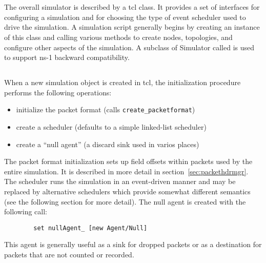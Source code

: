 %
%
\section{}

The overall simulator is described by a  tcl class.
It provides a set of interfaces for configuring a simulation
and for choosing the type of event scheduler used to drive
the simulation.
A simulation script generally begins by creating an instance
of this class and calling various methods to create nodes, topologies,
and configure other aspects of the simulation.
A subclass of Simulator called  is used to support
ns-1 backward compatibility.

\subsection{}

When a new simulation object is created in tcl, the initialization
procedure performs the following operations:
\begin{itemize}
	\item initialize the packet format (calls {\tt create\_packetformat})
	\item create a scheduler (defaults to a simple linked-list scheduler)
	\item create a ``null agent'' (a discard sink used in varios places)
\end{itemize}
The packet format initialization sets up field offsets within packets
used by the entire simulation.  It is described in more detail
in section~\ref{sec:packethdrmgr}.
The scheduler runs the simulation in an event-driven manner and may
be replaced by alternative schedulers which provide somewhat
different semantics (see the following section for more detail).
The null agent is created with the following call:
\begin{small}
\begin{verbatim}
        set nullAgent_ [new Agent/Null]
\end{verbatim}
\end{small}
This agent is generally useful as a sink for dropped packets or
as a destination for packets that are not counted or recorded.

\subsection{}

